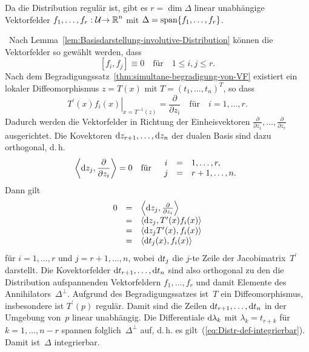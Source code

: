\begin{svmultproof2}
Da die Distribution regulär ist, gibt es $r=\dim\Delta$ linear unabhängige
Vektor\-felder $f_{1},\ldots,f_{r}:\mathcal{U}{\to{\mathbb{R}}}^{n}$ mit $\Delta={\operatorname{span}}\{f_{1},\ldots,f_{r}\}$.

\hinreichend\ Nach Lemma~\ref{lem:Basisdarstellung-involutive-Distribution}
können die Vektorfelder so gewählt werden, dass 
\[
[f_{i},f_{j}]\equiv0\quad\mbox{für}\quad1\leq i,j\leq r.
\]
Nach dem Begradigungssatz~\ref{thm:simultane-begradigung-von-VF}
existiert ein lokaler Diffeomorphismus $z=T(x)$ mit $T=(t_{1},\ldots,t_{n})^{T}$,
so dass
\[
\left.T^{\prime}(x)f_{i}(x)\right|_{x=T^{-1}(z)}=\frac{\partial}{\partial z_{i}}\quad\mbox{für}\quad i=1,\ldots,r.
\]
Dadurch werden die Vektorfelder in Richtung der Einheisvektoren $\tfrac{\partial}{\partial z_{1}},\ldots,\tfrac{\partial}{\partial z_{r}}$
ausgerichtet. Die Kovektoren ${\mathrm{d}} z_{r+1},\ldots,{\mathrm{d}} z_{n}$ der dualen
Basis sind dazu orthogonal, d.\,h. 
\[
\left\langle {\mathrm{d}} z_{j},\frac{\partial}{\partial z_{i}}\right\rangle =0\quad\mbox{für}\quad\begin{array}{ccl}
i & = & 1,\ldots,r,\\
j & = & r+1,\ldots,n.
\end{array}
\]
Dann gilt
\[
\begin{array}{ccl}
0 & = & \left\langle {\mathrm{d}} z_{j},\frac{\partial}{\partial z_{i}}\right\rangle \\
 & = & \left\langle {\mathrm{d}} z_{j},T^{\prime}(x)f_{i}(x)\right\rangle \\
 & = & \left\langle {\mathrm{d}} z_{j}T^{\prime}(x),f_{i}(x)\right\rangle \\
 & = & \left\langle {\mathrm{d}} t_{j}(x),f_{i}(x)\right\rangle 
\end{array}
\]
für $i=1,\ldots,r$ und $j=r+1,\ldots,n$, wobei ${\mathrm{d}} t_{j}$ die $j$-te
Zeile der Jacobi\-matrix~$T^{\prime}$ darstellt. Die Kovektorfelder
${\mathrm{d}} t_{r+1},\ldots,{\mathrm{d}} t_{n}$ sind also orthogonal zu den die Distribution
aufspannenden Vektorfeldern $f_{1},\ldots,f_{r}$ und damit Elemente
des Annihilators~$\Delta^{\perp}$. Aufgrund des Begradigungssatzes
ist~$T$ ein Diffeomorphismus, insbesondere ist $T^{\prime}(p)$
regulär. Damit sind die Zeilen ${\mathrm{d}} t_{r+1},\ldots,{\mathrm{d}} t_{n}$ in der
Umgebung von~$p$ linear unabhängig. Die Differentiale ${\mathrm{d}}\lambda_{k}$
mit $\lambda_{k}=t_{r+k}$ für $k=1,\ldots,n-r$ spannen folglich~$\Delta^{\perp}$
auf, d.\,h. es gilt~(\ref{eq:Distr-def-integrierbar}). Damit ist~$\Delta$
integrierbar.


\end{svmultproof2}
